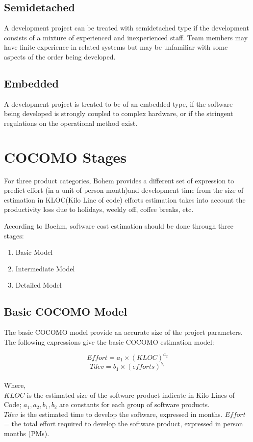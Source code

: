 \subsection{Semidetached}
A development project can be treated with semidetached type if the development consists of a mixture of experienced and inexperienced staff. Team members may have finite experience in related systems but may be unfamiliar with some aspects of the order being developed.

\subsection{Embedded}
A development project is treated to be of an embedded type, if the software being developed is strongly coupled to complex hardware, or if the stringent regulations on the operational method exist.

\section{COCOMO Stages}
For three product categories, Bohem provides a different set of expression to predict effort (in a unit of person month)and development time from the size of estimation in KLOC(Kilo Line of code) efforts estimation takes into account the productivity loss due to holidays, weekly off, coffee breaks, etc.

According to Boehm, software cost estimation should be done through three stages:

\begin{enumerate}
 \item Basic Model
 \item Intermediate Model
 \item Detailed Model
\end{enumerate}

\subsection{Basic COCOMO Model}
The basic COCOMO model provide an accurate size of the project parameters. The following expressions give the basic COCOMO estimation model:

$$Effort = a_1 \times (KLOC) ^ {a_2}$$
$$Tdev = b_1 \times (efforts) ^ {b_2}$$
\\
Where, \\
$KLOC$ is the estimated size of the software product indicate in Kilo Lines of Code; $a_1, a_2, b_1, b_2$ are constants for each group of software products. \\
$Tdev$ is the estimated time to develop the software, expressed in months.
$Effort$ = the total effort required to develop the software product, expressed in person months (PMs).

